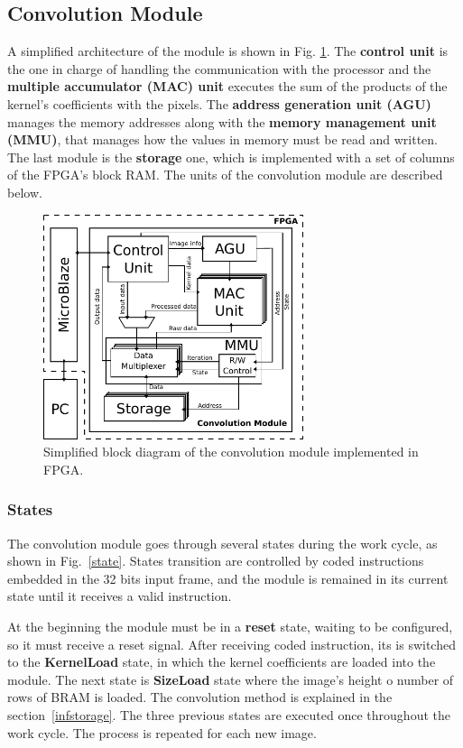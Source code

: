 \documentclass[conference,compsoc]{IEEEtran}
\begin{document}
\subsection{Convolution Module}
A simplified architecture of the module is shown in Fig. \ref{general}. The
\textbf{control unit} is the one in charge of handling the communication with
the processor and the \textbf{multiple accumulator (MAC) unit} executes the sum
of the products of the kernel's coefficients with the pixels. The
\textbf{address generation unit (AGU)} manages the memory addresses along with
the \textbf{memory management unit (MMU)}, that manages how the values in memory
must be read and written. The last module is the \textbf{storage} one, which is
implemented with a set of columns of the FPGA's block RAM. The units of the
convolution module are described below.


\begin{figure}[!t]
\centering
\includegraphics[width=3in]{general.pdf}
\caption{Simplified block diagram of the convolution module implemented in FPGA.}
\label{general}
\end{figure}

\subsubsection{States}
The convolution module goes through several states during the work cycle, as
shown in Fig.~\ref{state}. States transition are controlled by coded
instructions embedded in the 32 bits input frame, and the module is remained in
its current state until it receives a valid instruction.

At the beginning the module must be in a \textbf{reset} state, waiting to be
configured, so it must receive a reset signal. After receiving coded
instruction, its is switched to the \textbf{KernelLoad} state, in which the
kernel coefficients are loaded into the module. The next state is
\textbf{SizeLoad} state where the image's height o number of rows of BRAM is
loaded. The convolution method is explained in the section~\ref{infstorage}. The
three previous states are executed once throughout the work cycle. The process
is repeated for each new image.
\end{document}
